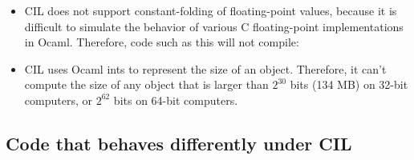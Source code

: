 \documentclass[letterpaper]{article}
\begin{document}
\begin{itemize}
\item CIL does not support constant-folding of floating-point values,
  because it is difficult to simulate the behavior of various
  C floating-point implementations in Ocaml.  Therefore, code such as
  this will not compile:

\item CIL uses Ocaml ints to represent the size of an object.
  Therefore, it can't compute the size of any object that is larger
  than $2^{30}$ bits (134 MB) on 32-bit computers, or $2^{62}$ bits on
  64-bit computers.

\end{itemize}

\subsection{Code that behaves differently under CIL}
\end{document}
